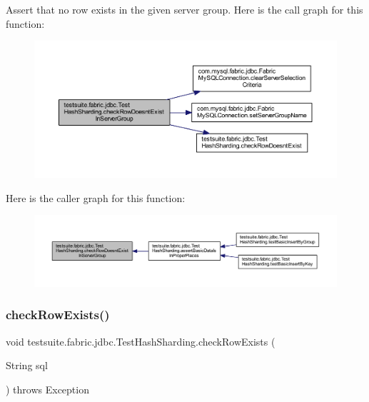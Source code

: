 Assert that no row exists in the given server group. Here is the call graph for this function\+:
\nopagebreak
\begin{figure}[H]
\begin{center}
\leavevmode
\includegraphics[width=350pt]{classtestsuite_1_1fabric_1_1jdbc_1_1_test_hash_sharding_afe45f293836ac4ee4e67255e208fb36b_cgraph}
\end{center}
\end{figure}
Here is the caller graph for this function\+:
\nopagebreak
\begin{figure}[H]
\begin{center}
\leavevmode
\includegraphics[width=350pt]{classtestsuite_1_1fabric_1_1jdbc_1_1_test_hash_sharding_afe45f293836ac4ee4e67255e208fb36b_icgraph}
\end{center}
\end{figure}
\mbox{\label{classtestsuite_1_1fabric_1_1jdbc_1_1_test_hash_sharding_a62e92dd2a4d030bd60a3812e4561094b}} 
\subsubsection{\texorpdfstring{check\+Row\+Exists()}{checkRowExists()}}
{\footnotesize\ttfamily void testsuite.\+fabric.\+jdbc.\+Test\+Hash\+Sharding.\+check\+Row\+Exists (\begin{DoxyParamCaption}\item[{String}]{sql }\end{DoxyParamCaption}) throws Exception\hspace{0.3cm}{\ttfamily [protected]}}

